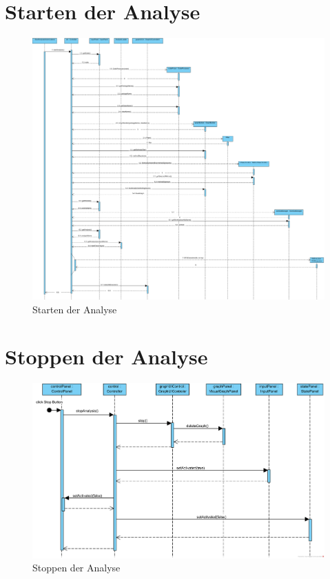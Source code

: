 \section{Starten der Analyse}
\begin{figure} [!htp]
  \centering
    \includegraphics[width=1\textwidth]{Sequenzdiagramme/AnalysisStart}
  \caption{Starten der Analyse}
  \label{fig:anaStart}
\end{figure}
\FloatBarrier
\clearpage

\section{Stoppen der Analyse}
\begin{figure}[!htp]
  \centering
    \includegraphics[width=1\textwidth]{Sequenzdiagramme/AnalysisStop}
  \caption{Stoppen der Analyse}
  \label{fig:anaStop}
\end{figure}
\clearpage

